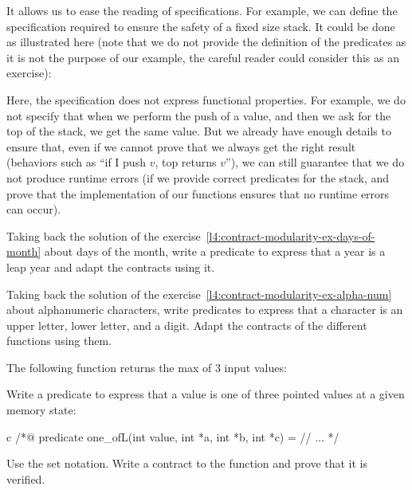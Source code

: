 It allows us to ease the reading of specifications. For example, we can
define the specification required to ensure the safety of a fixed size
stack. It could be done as illustrated here (note that we do not
provide the definition of the predicates as it is not the purpose of
our example, the careful reader could consider this as an exercise):






Here, the specification does not express functional properties. For
example, we do not specify that when we perform the push of a value, and
then we ask for the top of the stack, we get the same value. But we
already have enough details to ensure that, even if we cannot prove that
we always get the right result (behaviors such as ``if I push \(v\), top
returns \(v\)''), we can still guarantee that we do not produce runtime
errors (if we provide correct predicates for the stack, and prove
that the implementation of our functions ensures that no runtime errors
can occur).






Taking back the solution of the
exercise~\ref{l4:contract-modularity-ex-days-of-month} about days of the month,
write a predicate to express that a year is a leap year and adapt the contracts
using it.




Taking back the solution of the
exercise~\ref{l4:contract-modularity-ex-alpha-num} about alphanumeric
characters, write predicates to express that a character is an upper letter,
lower letter, and a digit. Adapt the contracts of the different functions using
them.




The following function returns the max of 3 input values:




Write a predicate to express that a value is one of three pointed values at a
given memory state:

\begin{CodeBlock}{c}
/*@
  predicate one_of{L}(int value, int *a, int *b, int *c) =
    // ...
*/
\end{CodeBlock}

Use the set notation. Write a contract to the function and prove that it is
verified.


